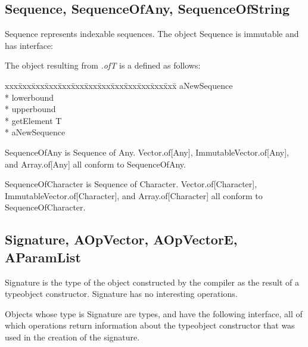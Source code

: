 \subsection{Sequence, SequenceOfAny, SequenceOfString}
Sequence represents indexable sequences.  The object Sequence is immutable
and has interface:
\begin{desc}
  \item[\kw{function} of\/\LB{}T \CO{} \tn{type}\/\RB{} \returns{}
  \/\LB{}aNewSequenceType \CO{} Type\/\RB{} \kw{forall} T]
\end{desc}

\noindent The object resulting from {\it {}.of\/\LB{}T\/\RB{}}
is a  defined as follows:

{\it\begin{minipage}{\textwidth}\begin{tabbing}
xxx\=xxx\=xxx\=xxx\=xxx\=xxx\=xxx\=xxx\=xxx\=xxx\=xxx\=xxx\=xxx\=\+\kill%
 aNewSequence\+\\*{}%
   lowerbound \returns{} \/\LB{}\/\RB{}\\*{}%
   upperbound \returns{} \/\LB{}\/\RB{}\\*{}%
   getElement\/\LB{}\/\RB{} \returns{} \/\LB{}T\/\RB{}\-\\*{}%
 aNewSequence
\end{tabbing}\end{minipage}}

\label{builtin SequenceOfAny}
SequenceOfAny is Sequence of Any.
Vector.of[Any], ImmutableVector.of[Any], and Array.of[Any]
all conform to SequenceOfAny.

\label{builtin SequenceOfCharacter}
SequenceOfCharacter is Sequence of Character.
Vector.of[Character], ImmutableVector.of[Character], and Array.of[Character]
all conform to SequenceOfCharacter.

\subsection{Signature, AOpVector, AOpVectorE, AParamList}
\label{builtin Signature}
Signature is the type of the object constructed by the compiler as the
result of a typeobject constructor.  Signature has no interesting operations.

\noindent Objects whose type is Signature are types, and have the
following interface, all of which operations return information about the
typeobject constructor that was used in the creation of the signature.

